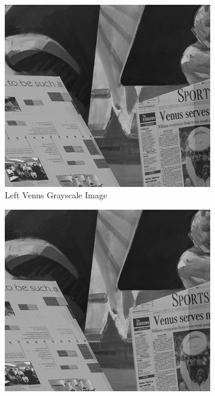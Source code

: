 \begin{figure}
\begin{center}
	\begin{subfigure}{0.45\textwidth}
		\includegraphics[width=\textwidth]{figures/venusL.png}
		\caption{Left Venus Grayscale Image}
		\label{fig:venusL}
	\end{subfigure}
	\begin{subfigure}{0.45\textwidth}
		\includegraphics[width=\textwidth]{figures/venusR.png}

\end{subfigure}
\end{center}
\end{figure}
